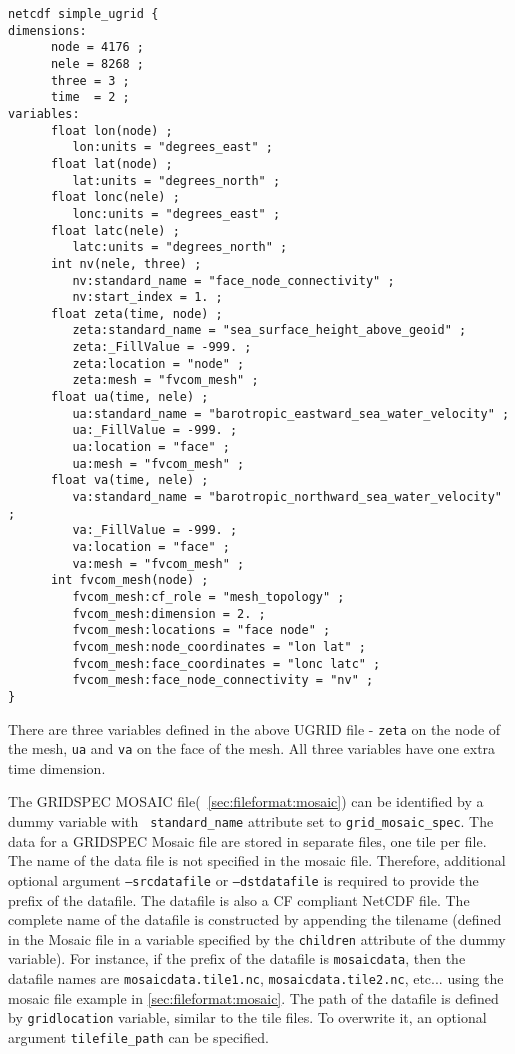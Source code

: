 \label{ugridexample}
\begin{verbatim}
netcdf simple_ugrid {
dimensions:
      node = 4176 ; 
      nele = 8268 ;
      three = 3 ;
      time  = 2 ;
variables:
      float lon(node) ;
         lon:units = "degrees_east" ;
      float lat(node) ;
         lat:units = "degrees_north" ;
      float lonc(nele) ;
         lonc:units = "degrees_east" ;
      float latc(nele) ;
         latc:units = "degrees_north" ;
      int nv(nele, three) ;
         nv:standard_name = "face_node_connectivity" ;
         nv:start_index = 1. ;
      float zeta(time, node) ;
         zeta:standard_name = "sea_surface_height_above_geoid" ;
         zeta:_FillValue = -999. ;
         zeta:location = "node" ;
         zeta:mesh = "fvcom_mesh" ;
      float ua(time, nele) ;
         ua:standard_name = "barotropic_eastward_sea_water_velocity" ;
         ua:_FillValue = -999. ;
         ua:location = "face" ;
         ua:mesh = "fvcom_mesh" ;
      float va(time, nele) ;
         va:standard_name = "barotropic_northward_sea_water_velocity" ;
         va:_FillValue = -999. ;
         va:location = "face" ;
         va:mesh = "fvcom_mesh" ;
      int fvcom_mesh(node) ;
         fvcom_mesh:cf_role = "mesh_topology" ;
         fvcom_mesh:dimension = 2. ;
         fvcom_mesh:locations = "face node" ;
         fvcom_mesh:node_coordinates = "lon lat" ;
         fvcom_mesh:face_coordinates = "lonc latc" ;
         fvcom_mesh:face_node_connectivity = "nv" ;
}
\end{verbatim}

There are three variables defined in the above UGRID file - {\tt zeta} on the node of the mesh, {\tt ua} and
{\tt va} on the face of the mesh.  All three variables have one extra time dimension.  

The GRIDSPEC MOSAIC file(~\ref{sec:fileformat:mosaic}) can be identified by a dummy variable with {\tt
  standard\_name} attribute set to {\tt grid\_mosaic\_spec}.  The data for a
GRIDSPEC Mosaic file are stored in separate files, one tile per file.  The
name of the data file is not specified in the mosaic file.  Therefore,
additional optional argument {\tt --srcdatafile} or {\tt --dstdatafile} is
required to provide the prefix of the datafile.  The datafile is also a CF
compliant NetCDF file.  The complete name of the datafile is
constructed by appending the tilename (defined in the Mosaic file in a
variable specified by the {\tt children} attribute of the dummy variable).
For instance, if the prefix of the datafile is {\tt mosaicdata}, then the
datafile names are {\tt mosaicdata.tile1.nc}, {\tt mosaicdata.tile2.nc},
etc...  using the mosaic file example in \ref{sec:fileformat:mosaic}.  The
path of the datafile is defined by {\tt gridlocation} variable, similar to the
tile files.  To overwrite it, an optional argument {\tt tilefile\_path} can be
specified.  

